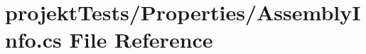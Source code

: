 \section{projekt\+Tests/\+Properties/\+Assembly\+Info.cs File Reference}
\label{projektTests_2Properties_2AssemblyInfo_8cs}

